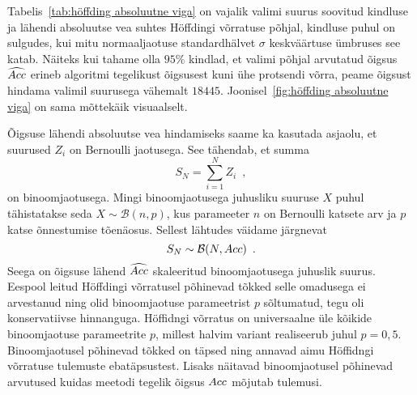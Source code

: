 Tabelis~\ref{tab:höffding absoluutne viga} on vajalik valimi suurus soovitud kindluse ja lähendi absoluutse vea suhtes Höffdingi võrratuse põhjal, kindluse puhul on sulgudes, kui mitu normaaljaotuse standardhälvet $\sigma$ keskväärtuse ümbruses see katab. Näiteks kui tahame olla $95\%$ kindlad, et valimi põhjal arvutatud õigsus $\widehat{Acc}$ erineb algoritmi tegelikust õigsusest kuni ühe protsendi võrra, peame õigsust hindama valimil suurusega vähemalt $18445$. Joonisel~\ref{fig:höffding absoluutne viga} on sama mõttekäik visuaalselt.

Õigsuse lähendi absoluutse vea hindamiseks saame ka kasutada asjaolu, et suurused $Z_i$ on Bernoulli jaotusega. See tähendab, et summa
\begin{equation*}
    S_N = \sum^{N}_{i = 1} Z_i \enspace,
\end{equation*}
on binoomjaotusega. Mingi binoomjaotusega juhusliku suuruse $X$ puhul tähistatakse seda $X \sim \mathcal{B}(n, p)$, kus parameeter $n$ on Bernoulli katsete arv ja $p$ katse õnnestumise tõenäosus. Sellest lähtudes väidame järgnevat
\begin{equation*}
    S_N \sim \mathcal{B}(N, Acc) \enspace.
\end{equation*}
Seega on õigsuse lähend $\widehat{Acc}$ skaleeritud binoomjaotusega juhuslik suurus. Eespool leitud Höffdingi võrratusel põhinevad tõkked selle omadusega ei arvestanud ning olid binoomjaotuse parameetrist $p$ sõltumatud, tegu oli konservatiivse hinnanguga. Höffidngi võrratus on universaalne üle kõikide binoomjaotuse parameetrite $p$, millest halvim variant realiseerub juhul $p = 0{,}5$. Binoomjaotusel põhinevad tõkked on täpsed ning annavad aimu Höffidngi võrratuse tulemuste ebatäpsustest. Lisaks näitavad binoomjaotusel põhinevad arvutused kuidas meetodi tegelik õigsus $Acc$ mõjutab tulemusi.

